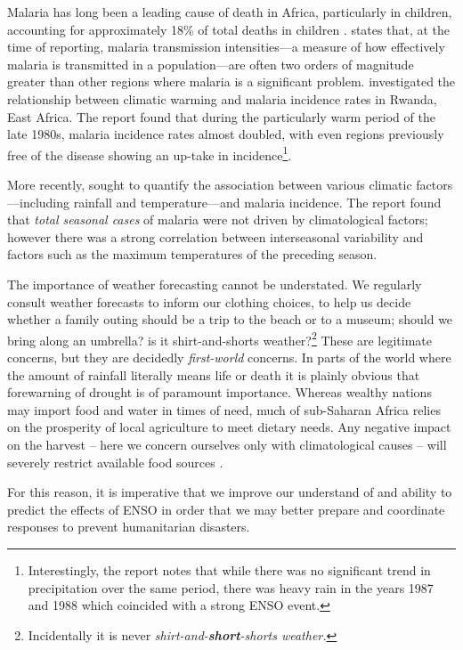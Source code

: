 Malaria has long been a leading cause of death in Africa, particularly in
children, accounting for approximately 18\% of total deaths in children
\citep{IMHE2016}. \citet{Alles1998} states that, at the time of reporting,
malaria transmission intensities---a measure of how effectively malaria is
transmitted in a population---are often two orders of magnitude greater than other
regions where malaria is a significant problem. \citet{loevinsohn1994}
investigated the relationship between climatic warming and malaria incidence
rates in Rwanda, East Africa. The report found that during the particularly warm
period of the late 1980s, malaria incidence rates almost doubled, with even
regions previously free of the disease showing an up-take in
incidence\footnote{Interestingly, the report notes that while there was no
  significant trend in precipitation over the same period, there was heavy rain
  in the years 1987 and 1988 which coincided with a strong ENSO event.}.

More recently, \cite{craig2004} sought to quantify the association between
various climatic factors---including rainfall and temperature---and malaria
incidence. The report found that \emph{total seasonal cases} of malaria were not
driven by climatological factors; however there was a strong correlation between
interseasonal variability and factors such as the maximum temperatures of the
preceding season.

\vspace{0.5cm}

The importance of weather forecasting cannot be understated. We regularly
consult weather forecasts to inform our clothing choices, to help us decide
whether a family outing should be a trip to the beach or to a museum; should we
bring along an umbrella? is it shirt-and-shorts weather?\footnote{Incidentally
  it is never \emph{shirt-and-\textbf{short}-shorts weather.}} These are
legitimate concerns, but they are decidedly \emph{first-world} concerns. In
parts of the world where the amount of rainfall literally means life or death it
is plainly obvious that forewarning of drought is of paramount importance.
Whereas wealthy nations may import food and water in times of need, much of
sub-Saharan Africa relies on the prosperity of local agriculture to meet dietary
needs. Any negative impact on the harvest -- here we concern ourselves only with
climatological causes -- will severely restrict available food sources
\citep{development2006mapping}.

For this reason, it is imperative that we improve our understand of and ability
to predict the effects of ENSO in order that we may better prepare and
coordinate responses to prevent humanitarian disasters.

